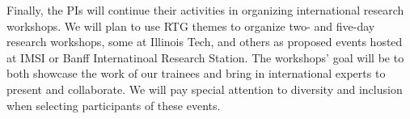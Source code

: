 \documentclass[11pt]{NSFamsart}
\newcommand{\FredNote}[1]{{\color{blue} Fred: #1}}
\begin{document}
Finally, the PIs will continue their activities in organizing international research workshops. We will plan to use RTG themes to organize two- and five-day  research workshops, some at Illinois Tech, and others  as proposed events hosted at IMSI or Banff Internatinoal Research Station. The workshops' goal will be to both showcase the work of our trainees and bring in international experts to present and collaborate. We will pay special attention to diversity and inclusion when selecting participants of these events. 


 
\end{document}
